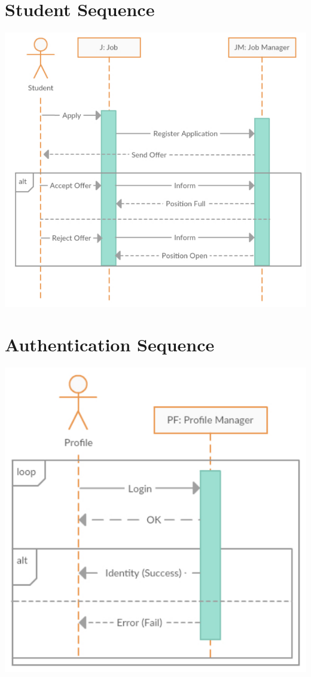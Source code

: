 \documentclass[12pt,openany]{report}
\begin{document}
\section{Student Sequence}
\includegraphics[scale=1.0]{model/Diagrams/Sequence/SeqStudent}
\section{Authentication Sequence}
\includegraphics[scale=0.8]{model/Diagrams/Sequence/SeqAuthentication}
\end{document}

